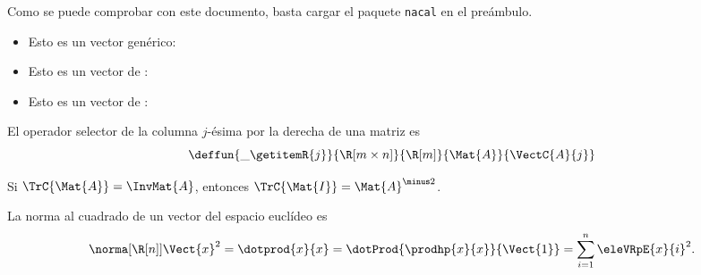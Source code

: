 \documentclass{article}
\begin{document}
Como se puede comprobar con este documento, basta cargar el paquete
\texttt{nacal} en el preámbulo.
\bigskip

\begin{itemize}
\item Esto es un vector genérico:\; 
\item Esto es un vector de \R[n]:\; 
\item Esto es un vector de \R[m\times n]:\; 
\end{itemize}

El operador selector de la columna $j$-ésima por la derecha de una matriz es
\begin{displaymath}
  \deffun{\_\getitemR{j}}{\R[m\times n]}{\R[m]}{\Mat{A}}{\VectC{A}{j}}
\end{displaymath}


Si $\TrC{\Mat{A}}=\InvMat{A}$, entonces $\TrC{\Mat{I}}=\Mat{A}^{\minus2}$.
\bigskip

La norma al cuadrado de un vector del espacio euclídeo \R[n] es
\[
  \norma[\R[n]]{\Vect{x}}^2=
  \dotprod{x}{x}=
  \dotProd{\prodhp{x}{x}}{\Vect{1}}=
  \sum_{i=1}^n\eleVRpE{x}{i}^2.
\]
\end{document}

